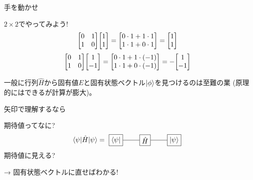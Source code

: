 \documentclass[dvipdfm]{beamer}
\begin{document}
\begin{frame}{手を動かせ}
    \begin{eg*}{$2\times2$でやってみよう!}{}
        \begin{equation*}
            \mqty[0 & 1 \\ 1 & 0]
            \mqty[1 \\ 1]
            =
            \mqty[0\cdot1+1\cdot1 \\ 1\cdot1+0\cdot1]
            =
            \mqty[1 \\ 1]
        \end{equation*}
        \begin{equation*}
            \mqty[0 & 1 \\ 1 & 0]
            \mqty[1 \\ -1]
            =
            \mqty[0\cdot1+1\cdot(-1) \\ 1\cdot1+0\cdot(-1)]
            =
            -\mqty[1 \\ -1]
        \end{equation*}
    \end{eg*}
    一般に行列$\hat{H}$から固有値$E$と固有状態ベクトル$\ket{\phi}$を見つけるのは至難の業
    (原理的にはできるが計算が膨大)。
\end{frame}

\begin{frame}{矢印で理解するなら}
\end{frame}

\begin{frame}{期待値ってなに?}
    \begin{equation*}
        \ev{\hat{H}}{\psi}
        =
        \vcenter{\hbox{
            \begin{tikzpicture}
                \node at(0,0)[draw, rectangle](H){$\hat{H}$};
                \node at(1.5,0)[draw, rectangle](ket){$\ket{\psi}$};
                \node at(-1.5,0)[draw, rectangle](bra){$\bra{\psi}$};
                \draw(H.west)--(bra.east);
                \draw(H.east)--(ket.west);
            \end{tikzpicture}
        }}
    \end{equation*}
    期待値に見える?

    → 固有状態ベクトルに直せばわかる!
\end{frame}
\end{document}

